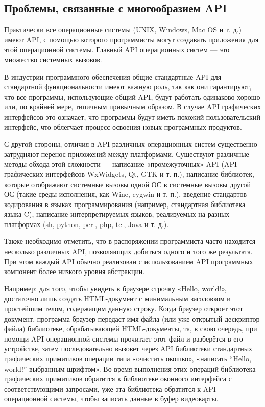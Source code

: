 \subsection{Проблемы, связанные с многообразием API}
Практически все операционные системы (UNIX, Windows, Mac OS и т. д.) имеют API, с помощью которого программисты могут создавать приложения для этой операционной системы. Главный API операционных систем — это множество системных вызовов.

В индустрии программного обеспечения общие стандартные API для стандартной функциональности имеют важную роль, так как они гарантируют, что все программы, использующие общий API, будут работать одинаково хорошо или, по крайней мере, типичным привычным образом. В случае API графических интерфейсов это означает, что программы будут иметь похожий пользовательский интерфейс, что облегчает процесс освоения новых программных продуктов.

С другой стороны, отличия в API различных операционных систем существенно затрудняют перенос приложений между платформами. Существуют различные методы обхода этой сложности — написание «промежуточных» API (API графических интерфейсов WxWidgets, Qt, GTK и т. п.), написание библиотек, которые отображают системные вызовы одной ОС в системные вызовы другой ОС (такие среды исполнения, как Wine, cygwin и т. п.), введение стандартов кодирования в языках программирования (например, стандартная библиотека языка C), написание интерпретируемых языков, реализуемых на разных платформах (sh, python, perl, php, tcl, Java и т. д.).

Также необходимо отметить, что в распоряжении программиста часто находится несколько различных API, позволяющих добиться одного и того же результата. При этом каждый API обычно реализован с использованием API программных компонент более низкого уровня абстракции.

Например: для того, чтобы увидеть в браузере строчку «Hello, world!», достаточно лишь создать HTML-документ с минимальным заголовком и простейшим телом, содержащим данную строку. Когда браузер откроет этот документ, программа-браузер передаст имя файла (или уже открытый дескриптор файла) библиотеке, обрабатывающей HTML-документы, та, в свою очередь, при помощи API операционной системы прочитает этот файл и разберётся в его устройстве, затем последовательно вызовет через API библиотеки стандартных графических примитивов операции типа «очистить окошко», «написать “Hello, world!” выбранным шрифтом». Во время выполнения этих операций библиотека графических примитивов обратится к библиотеке оконного интерфейса с соответствующими запросами, уже эта библиотека обратится к API операционной системы, чтобы записать данные в буфер видеокарты.

